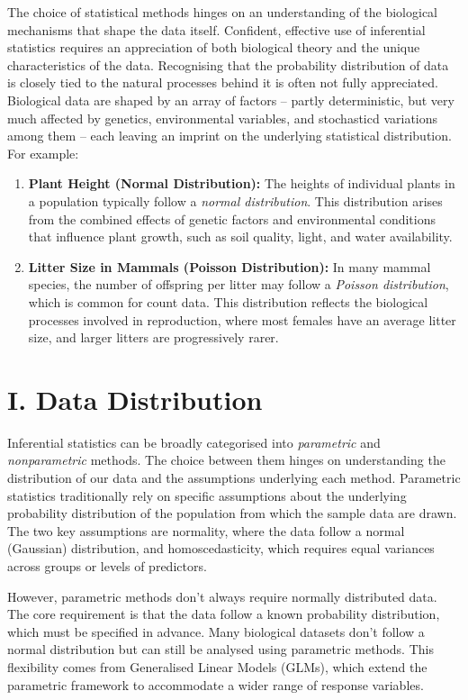 \documentclass[
  letterpaper,
]{book}
\begin{document}
The choice of statistical methods hinges on an understanding of the
biological mechanisms that shape the data itself. Confident, effective
use of inferential statistics requires an appreciation of both
biological theory and the unique characteristics of the data.
Recognising that the probability distribution of data is closely tied to
the natural processes behind it is often not fully appreciated.
Biological data are shaped by an array of factors -- partly
deterministic, but very much affected by genetics, environmental
variables, and stochasticd variations among them -- each leaving an
imprint on the underlying statistical distribution. For example:

\begin{enumerate}
\def\labelenumi{\arabic{enumi}.}
\item
  \textbf{Plant Height (Normal Distribution):} The heights of individual
  plants in a population typically follow a \emph{normal distribution}.
  This distribution arises from the combined effects of genetic factors
  and environmental conditions that influence plant growth, such as soil
  quality, light, and water availability.
\item
  \textbf{Litter Size in Mammals (Poisson Distribution):} In many mammal
  species, the number of offspring per litter may follow a \emph{Poisson
  distribution}, which is common for count data. This distribution
  reflects the biological processes involved in reproduction, where most
  females have an average litter size, and larger litters are
  progressively rarer.
\end{enumerate}

\section{I. Data Distribution}\label{i.-data-distribution}

Inferential statistics can be broadly categorised into \emph{parametric}
and \emph{nonparametric} methods. The choice between them hinges on
understanding the distribution of our data and the assumptions
underlying each method. Parametric statistics traditionally rely on
specific assumptions about the underlying probability distribution of
the population from which the sample data are drawn. The two key
assumptions are normality, where the data follow a normal (Gaussian)
distribution, and homoscedasticity, which requires equal variances
across groups or levels of predictors.

However, parametric methods don't always require normally distributed
data. The core requirement is that the data follow a known probability
distribution, which must be specified in advance. Many biological
datasets don't follow a normal distribution but can still be analysed
using parametric methods. This flexibility comes from Generalised Linear
Models (GLMs), which extend the parametric framework to accommodate a
wider range of response variables.
\end{document}
